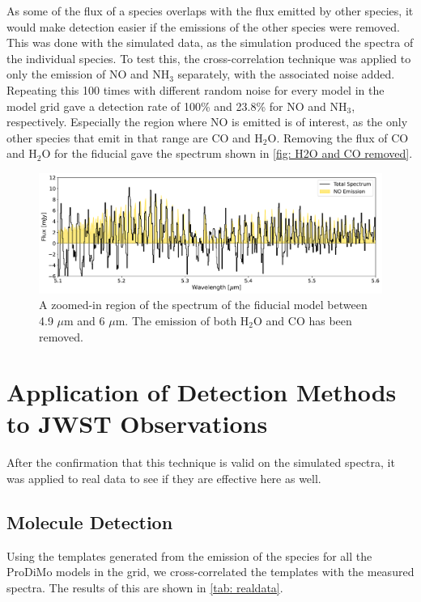 \documentclass[oneside, single, authoryear, semicolon, 12pt]{lion-msc}
\newcommand{\4}{$_4$}
\newcommand{\3}{$_3$}
\newcommand{\2}{$_2$}
\begin{document}
As some of the flux of a species overlaps with the flux emitted by other species, it would make detection easier if the emissions of the other species were removed. This was done with the simulated data, as the simulation produced the spectra of the individual species. To test this, the cross-correlation technique was applied to only the emission of NO and NH\3 separately, with the associated noise added. Repeating this 100 times with different random noise for every model in the model grid gave a detection rate of 100\% and 23.8\% for NO and NH\3, respectively.  Especially the region where NO is emitted is of interest, as the only other species that emit in that range are CO and H\2O. Removing the flux of CO and H\2O for the fiducial gave the spectrum shown in \autoref{fig: H2O and CO removed}.

\begin{figure}[H]
    \centering
    \includegraphics[width=\linewidth]{Figures/H2O_CO_removed.pdf}
    \caption{A zoomed-in region of the spectrum of the fiducial model between 4.9 $\mu$m and 6 $\mu$m. The emission of both H\2O and CO has been removed.}
    \label{fig: H2O and CO removed}
\end{figure}

\section{Application of Detection Methods to JWST Observations}
After the confirmation that this technique is valid on the simulated spectra, it was applied to real data to see if they are effective here as well.

\subsection{Molecule Detection}
Using the templates generated from the emission of the species for all the ProDiMo models in the grid, we cross-correlated the templates with the measured spectra. The results of this are shown in \autoref{tab: realdata}.
\end{document}
